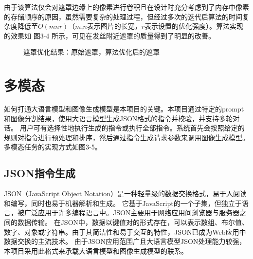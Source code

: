 \documentclass[a4paper,AutoFakeBold,oneside,12pt]{book}
\begin{document}
由于该算法仅会对遮罩边缘上的像素进行卷积且在设计时充分考虑到了内存中像素的存储顺序的原因，虽然需要复杂的处理过程，但经过多次的迭代后算法的时间复杂度降低至$O(mnr)$（$m$,$n$表示图片的长宽，$r$表示设置的优化强度）。算法实现的效果如 图3-4 所示，可见在发丝附近遮罩的质量得到了明显的改善。
\begin{figure}[!htbp]
    \centering
    \quad %
    \caption{遮罩优化结果：\protect{}原始遮罩，\protect{}算法优化后的遮罩} %
    \label{Fig:MaskOptimize} %
\end{figure}
\newpage
\section{多模态}
如何打通大语言模型和图像生成模型是本项目的关键。本项目通过特定的prompt和图像分割结果，使用大语言模型生成JSON格式的指令并校验，并支持多轮对话。
用户可有选择性地执行生成的指令或执行全部指令。系统首先会按照给定的规则对指令进行预处理和排序，然后通过指令生成请求参数来调用图像生成模型。多模态任务的实现方式如图3-5。

\subsection{JSON指令生成}
JSON（JavaScript Object Notation）是一种轻量级的数据交换格式，易于人阅读和编写，同时也易于机器解析和生成。
它基于JavaScript的一个子集，但独立于语言，被广泛应用于许多编程语言中。JSON主要用于网络应用间浏览器与服务器之间的数据传输。
在JSON中，数据以键值对的形式存在，可以表示数组、布尔值、数字、对象或字符串。由于其简洁性和易于交互的特性，JSON已成为Web应用中数据交换的主流技术。
由于JSON应用范围广且大语言模型JSON处理能力较强，本项目采用此格式来承载大语言模型和图像生成模型的联系。
\end{document}
